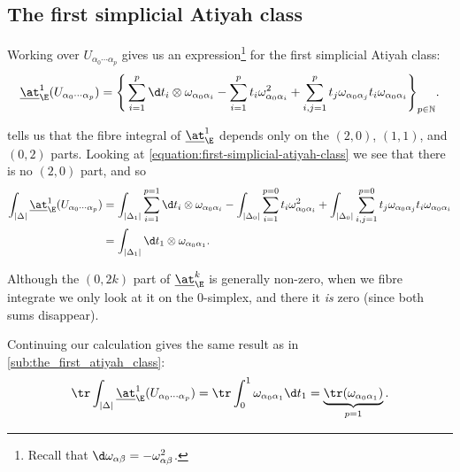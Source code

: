     \subsection{The first simplicial Atiyah class} %
    \label{sub:the-first-simplicial-atiyah-class}

        Working over $U_{\alpha_0\cdots\alpha_p}$ gives us an expression\footnote{Recall that $\d\omega_{\alpha\beta}=-\omega_{\alpha\beta}^2$.} for the first simplicial Atiyah class:
        \begin{equation}\label{equation:first-simplicial-atiyah-class}
            \underline{\at}^1_\E(U_{\alpha_0\cdots\alpha_p}) = \Bigg\{\sum_{i=1}^p\d t_i\otimes\omega_{\alpha_0\alpha_i} - \sum_{i=1}^pt_i\omega_{\alpha_0\alpha_i}^2 + \sum_{i,j=1}^p t_j\omega_{\alpha_0\alpha_j}t_i\omega_{\alpha_0\alpha_i}\Bigg\}_{p\in\mathbb{N}}.
        \end{equation}

         tells us that the fibre integral of $\underline{\at}_\E^1$ depends only on the $(2,0)$, $(1,1)$, and $(0,2)$ parts.
        Looking at \cref{equation:first-simplicial-atiyah-class} we see that there is no $(2,0)$ part, and so
        \begin{align*}
            \int_{|\Delta|}\underline{\at}_\E^1(U_{\alpha_0\cdots\alpha_p}) &= \int_{|\Delta_1|}\sum_{i=1}^{p=1}\d t_i\otimes\omega_{\alpha_0\alpha_i} - \int_{|\Delta_0|}\sum_{i=1}^{p=0}t_i\omega_{\alpha_0\alpha_i}^2 + \int_{|\Delta_0|}\sum_{i,j=1}^{p=0} t_j\omega_{\alpha_0\alpha_j}t_i\omega_{\alpha_0\alpha_i}\\
            &= \int_{|\Delta_1|}\d t_1\otimes\omega_{\alpha_0\alpha_1}.
        \end{align*}

        \begin{note}
            Although the $(0,2k)$ part of $\underline{\at}_\E^k$ is generally non-zero, when we fibre integrate we only look at it on the $0$-simplex, and there it \emph{is} zero (since both sums disappear).
        \end{note}

        Continuing our calculation gives the same result as in \cref{sub:the_first_atiyah_class}:
        \begin{equation}\label{equation:first-simplicial-atiyah-class-explicit}
            \tr\int_{|\Delta|}\underline{\at}_\E^1(U_{\alpha_0\cdots\alpha_p}) = \tr\int_0^1\omega_{\alpha_0\alpha_1} \d t_1 = \underbrace{\tr(\omega_{\alpha_0\alpha_1})}_{p=1}.
        \end{equation}

